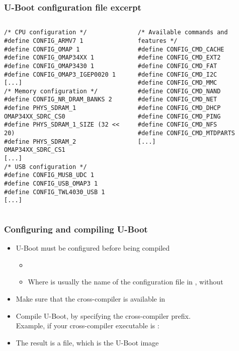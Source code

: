 \begin{frame}[fragile]
  \frametitle{U-Boot configuration file excerpt}
  \begin{columns}
    \scriptsize
\begin{verbatim}
/* CPU configuration */
#define CONFIG_ARMV7 1
#define CONFIG_OMAP 1
#define CONFIG_OMAP34XX 1
#define CONFIG_OMAP3430 1
#define CONFIG_OMAP3_IGEP0020 1
[...]
/* Memory configuration */
#define CONFIG_NR_DRAM_BANKS 2
#define PHYS_SDRAM_1 OMAP34XX_SDRC_CS0
#define PHYS_SDRAM_1_SIZE (32 <<  20)
#define PHYS_SDRAM_2 OMAP34XX_SDRC_CS1
[...]
/* USB configuration */
#define CONFIG_MUSB_UDC 1
#define CONFIG_USB_OMAP3 1
#define CONFIG_TWL4030_USB 1
[...]
\end{verbatim}
    \scriptsize
\begin{verbatim}
/* Available commands and features */
#define CONFIG_CMD_CACHE
#define CONFIG_CMD_EXT2
#define CONFIG_CMD_FAT
#define CONFIG_CMD_I2C
#define CONFIG_CMD_MMC
#define CONFIG_CMD_NAND
#define CONFIG_CMD_NET
#define CONFIG_CMD_DHCP
#define CONFIG_CMD_PING
#define CONFIG_CMD_NFS
#define CONFIG_CMD_MTDPARTS
[...]
\end{verbatim}
  \end{columns}
\end{frame}

\begin{frame}
  \frametitle{Configuring and compiling U-Boot}
  \begin{itemize}
  \item U-Boot must be configured before being compiled
    \begin{itemize}
    \item {}
    \item Where  is usually the name of the
      configuration file in , without 
    \end{itemize}
  \item Make sure that the cross-compiler is available in 
  \item Compile U-Boot, by specifying the cross-compiler prefix.\\
    Example, if your cross-compiler executable is :\\
  \item The result is a  file, which is the U-Boot
    image
  \end{itemize}
\end{frame}

